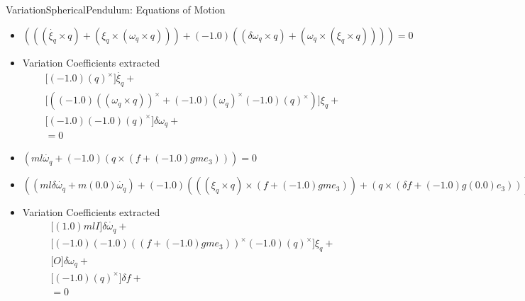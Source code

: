 VariationSphericalPendulum: Equations of Motion
\begin{itemize}
\item $(((\dot{\xi_{q}}\times q)+(\xi_{q}\times (\omega_{q}\times q)))+(-1.0)((\delta \omega_{q}\times q)+(\omega_{q}\times (\xi_{q}\times q))))=0$
\item Variation Coefficients extracted
\begin{gather}
\Big[(-1.0) {(q)}^\times\Big]\dot{\xi_{q}}+\nonumber\\
\Big[((-1.0) {((\omega_{q}\times q))}^\times+(-1.0) {(\omega_{q})}^\times (-1.0) {(q)}^\times)\Big]\xi_{q}+\nonumber\\
\Big[(-1.0) (-1.0) {(q)}^\times\Big]\delta \omega_{q}+\nonumber\\
=0
\end{gather}
\item $(m l\dot{\omega_{q}}+(-1.0)(q\times (f+(-1.0)gme_3)))=0$
\item $((m l\delta \dot{\omega_{q}}+m (0.0)\dot{\omega_{q}})+(-1.0)(((\xi_{q}\times q)\times (f+(-1.0)gme_3))+(q\times (\delta f+(-1.0)g(0.0)e_3))))=0$
\item Variation Coefficients extracted
\begin{gather}
\Big[(1.0) m l I\Big]\delta \dot{\omega_{q}}+\nonumber\\
\Big[(-1.0) (-1.0) {((f+(-1.0)gme_3))}^\times (-1.0) {(q)}^\times\Big]\xi_{q}+\nonumber\\
\Big[O\Big]\delta \omega_{q}+\nonumber\\
\Big[(-1.0) {(q)}^\times\Big]\delta f+\nonumber\\
=0
\end{gather}
\end{itemize}